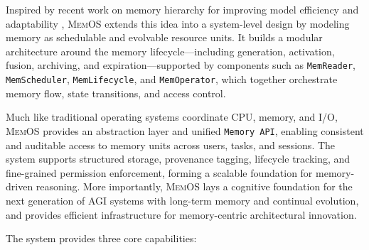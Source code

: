 \documentclass[]{memtensor}
\begin{document}
Inspired by recent work on memory hierarchy for improving model efficiency and adaptability \cite{memory3_Yang_2024}, \textsc{MemOS} extends this idea into a system-level design by modeling memory as schedulable and evolvable resource units.
It builds a modular architecture around the memory lifecycle—including generation, activation, fusion, archiving, and expiration—supported by components such as \texttt{MemReader}, \texttt{MemScheduler}, \texttt{MemLifecycle}, and \texttt{MemOperator}, which together orchestrate memory flow, state transitions, and access control.

Much like traditional operating systems coordinate CPU, memory, and I/O, \textsc{MemOS} provides an abstraction layer and unified \texttt{Memory API}, enabling consistent and auditable access to memory units across users, tasks, and sessions.
The system supports structured storage, provenance tagging, lifecycle tracking, and fine-grained permission enforcement, forming a scalable foundation for memory-driven reasoning.
More importantly, \textsc{MemOS} lays a cognitive foundation for the next generation of AGI systems with long-term memory and continual evolution, and provides efficient infrastructure for memory-centric architectural innovation.

The system provides three core capabilities:
\end{document}
